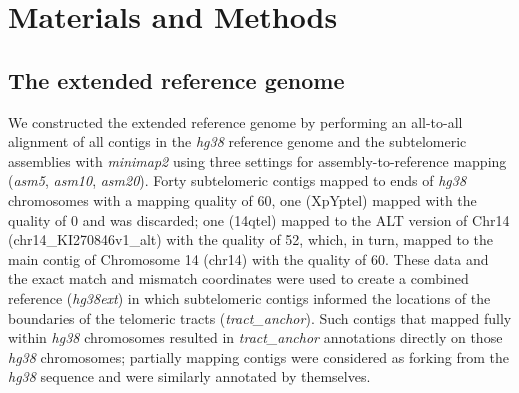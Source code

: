 \documentclass{article}
\begin{document}
\section*{Materials and Methods}  \label{sec:methods}

\subsection*{The extended reference genome}
    We constructed the extended reference genome by performing an all-to-all alignment
        of all contigs in the \textit{hg38} reference genome \parencite{grch38,hg38}
        and the subtelomeric assemblies \parencite{riethman2014}
        with \textit{minimap2} \parencite{minimap} using three settings
            for assembly-to-reference mapping (\textit{asm5}, \textit{asm10}, \textit{asm20}).
    Forty subtelomeric contigs mapped to ends of \textit{hg38} chromosomes with a mapping quality of 60,
        one (XpYptel) mapped with the quality of 0 and was discarded;
        one (14qtel) mapped to the ALT version of Chr14 (chr14\_KI270846v1\_alt) with the quality of 52,
            which, in turn, mapped to the main contig of Chromosome 14 (chr14) with the quality of 60.
    These data and the exact match and mismatch coordinates were used to create a combined reference (\textit{hg38ext})
        in which subtelomeric contigs informed the locations of the boundaries of the telomeric tracts (\textit{tract\_anchor}).
    Such contigs that mapped fully within \textit{hg38} chromosomes resulted in \textit{tract\_anchor} annotations
            directly on those \textit{hg38} chromosomes;
        partially mapping contigs were considered as forking from the \textit{hg38} sequence and were similarly annotated by themselves.
\end{document}
